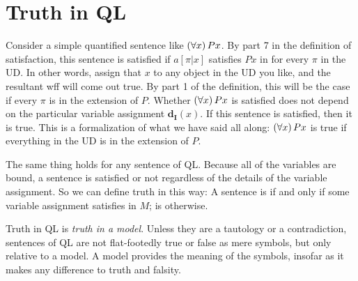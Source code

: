 \section{Truth in QL}

Consider a simple quantified sentence like $(\forall x) \,Px$. By part 7 in the definition of satisfaction, this sentence is satisfied if $a[\pi|x]$ satisfies $Px$ in  for every $\pi$ in the UD. In other words, assign that $x$ to any object in the UD you like, and the resultant wff will come out true. By part 1 of the definition, this will be the case if every $\pi$ is in the extension of $P$. Whether $(\forall x) \,Px$ is satisfied does not depend on the particular variable assignment $\mathbf{d_I}(x)$. If this sentence is satisfied, then it is true. This is a formalization of what we have said all along: $(\forall x) \,Px$ is true if everything in the UD is in the extension of $P$.

The same thing holds for any sentence of QL. Because all of the variables are bound, a sentence is satisfied or not regardless of the details of the variable assignment. So we can define truth in this way: A sentence \metaA{} is   if and only if some variable assignment satisfies \metaA{} in $M$; \metaA{} is   otherwise.

Truth in QL is \emph{truth in a model}. {\color{black}Unless they are a tautology or a contradiction,} sentences of QL are not flat-footedly true or false as mere symbols, but only relative to a model. A model provides the meaning of the symbols, insofar as it makes any difference to truth and falsity.


